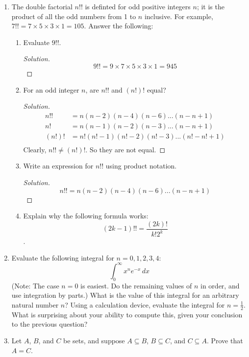 \documentclass[12pt]{article}
\renewcommand\qedsymbol{$\blacksquare$}
\newenvironment{solution}
{\begin{proof}[Solution]\renewcommand\qedsymbol{$\square$}}
	{\end{proof}}
\begin{document}
\begin{enumerate}
		\item
		The double factorial $n!!$ is definted for odd positive integers $n$; it is the product of all the odd numbers from 1 to $n$ inclusive. For example, $7!! = 7 \times 5 \times 3 \times 1 = 105$. Answer
		the following:
		\begin{enumerate}[label=(\alph*)]
			\item 
			Evaluate $9!!$.
			\begin{solution}
				\[ 9!! = 9\times 7\times 5\times 3\times 1 = 945 \]
			\end{solution}
			
			\item
			For an odd integer $n$, are $n!!$ and $(n!)!$ equal?
			\begin{solution}
				\begin{align*}
					n!!   &= n(n-2)(n-4)(n-6)...(n-n+1)\\
					n!    &= n(n-1)(n-2)(n-3)...(n-n+1)\\
					(n!)! &= n!(n!-1)(n!-2)(n!-3)...(n!-n!+1)\\
				\end{align*}
				Clearly, $\displaystyle n!!\neq (n!)!$. So they are not equal.
			\end{solution}
			
			\item
			Write an expression for $n!!$ using product notation.
			\begin{solution}
				\[ n!! = n(n-2)(n-4)(n-6)...(n-n+1) \]
			\end{solution}
			
			\item
			Explain why the following formula works:
			\[ (2k-1)!! = \frac{(2k)!}{k!2^k} \].
			
			
		\end{enumerate}
		
		\item
		Evaluate the following integral for $n = 0, 1, 2, 3, 4$:
		\[ \int_{0}^{\infty} x^ne^{-x} \,dx \]
		(Note: The case $n = 0$ is easiest. Do the remaining values of $n$ in order, and use integration by parts.) What is the value of this integral for an arbitrary natural number $n$? Using a calculation device, evaluate the integral for $n = \frac{1}{2}$. What is surprising about your ability to compute this, given your conclusion to the previous question?
		
		\item
		Let $A$, $B$, and $C$ be sets, and suppose $A \subseteq B$, $B \subseteq C$, and $C \subseteq A$. Prove that $A = C$.
		
	\end{enumerate}
\end{document}
